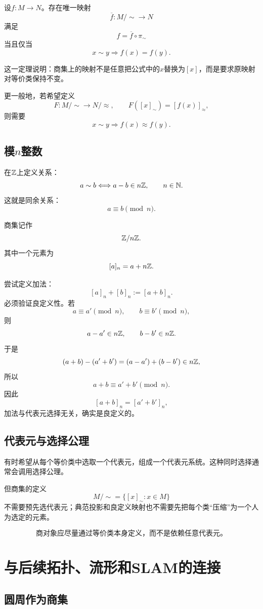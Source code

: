 \begin{theorem}[商集映射的因子分解]
设$f:M\to N$。存在唯一映射
\[
    \overline f:M/{\sim}\to N
\]
满足
\[
    f=\overline f\circ\pi_{\sim}
\]
当且仅当
\[
    x\sim y\Longrightarrow f(x)=f(y).
\]
\end{theorem}

这一定理说明：商集上的映射不是任意把公式中的$x$替换为$[x]$，而是要求原映射对等价类保持不变。

更一般地，若希望定义
\[
    F:M/{\sim}\to N/{\approx},
    \qquad
    F([x]_{\sim})=[f(x)]_{\approx},
\]
则需要
\[
    x\sim y
    \Longrightarrow
    f(x)\approx f(y).
\]

\subsection{模$n$整数}

在$\mathbb{Z}$上定义关系：
\[
    a\sim b
    \Longleftrightarrow
    a-b\in n\mathbb{Z},
    \qquad n\in\mathbb{N}.
\]
这就是同余关系：
\[
    a\equiv b\pmod n.
\]

商集记作
\[
    \mathbb{Z}/n\mathbb{Z}.
\]
其中一个元素为
\[
    [a]_n=a+n\mathbb{Z}.
\]

尝试定义加法：
\[
    [a]_n+[b]_n:=[a+b]_n.
\]
必须验证良定义性。若
\[
    a\equiv a'\pmod n,
    \qquad
    b\equiv b'\pmod n,
\]
则
\[
    a-a'\in n\mathbb{Z},\qquad b-b'\in n\mathbb{Z}.
\]
于是
\[
    (a+b)-(a'+b')
    =
    (a-a')+(b-b')
    \in n\mathbb{Z},
\]
所以
\[
    a+b\equiv a'+b'\pmod n.
\]
因此
\[
    [a+b]_n=[a'+b']_n,
\]
加法与代表元选择无关，确实是良定义的。

\subsection{代表元与选择公理}

有时希望从每个等价类中选取一个代表元，组成一个代表元系统。这种同时选择通常会调用选择公理。

但商集的定义
\[
    M/{\sim}=\{[x]_{\sim}:x\in M\}
\]
不需要预先选代表元；典范投影和良定义映射也不需要先把每个类“压缩”为一个人为选定的元素。

\[
    \boxed{
    \text{商对象应尽量通过等价类本身定义，而不是依赖任意代表元。}
    }
\]


\section{与后续拓扑、流形和SLAM的连接}

\subsection{圆周作为商集}

